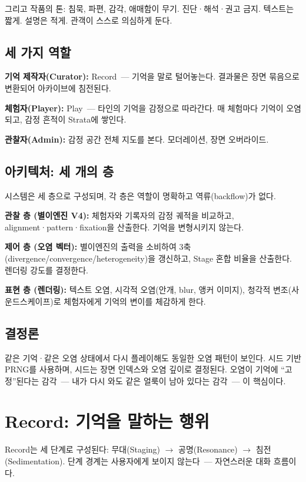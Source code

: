 \documentclass[11pt, a4paper]{article}
\begin{document}
그리고 작품의 톤: 침묵, 파편, 감각, 애매함이 무기. 진단·해석·권고 금지. 텍스트는 짧게. 설명은 적게. 관객이 스스로 의심하게 둔다.

\subsection{세 가지 역할}

\textbf{기억 제작자(Curator):} Record~--- 기억을 말로 털어놓는다. 결과물은 장면 묶음으로 변환되어 아카이브에 침전된다.

\textbf{체험자(Player):} Play~--- 타인의 기억을 감정으로 따라간다. 매 체험마다 기억이 오염되고, 감정 흔적이 Strata에 쌓인다.

\textbf{관찰자(Admin):} 감정 공간 전체 지도를 본다. 모더레이션, 장면 오버라이드.

\subsection{아키텍처: 세 개의 층}

시스템은 세 층으로 구성되며, 각 층은 역할이 명확하고 역류(backflow)가 없다.

\textbf{관찰 층 (별이엔진 V4):} 체험자와 기록자의 감정 궤적을 비교하고, alignment·pattern·fixation을 산출한다. 기억을 변형시키지 않는다.

\textbf{제어 층 (오염 벡터):} 별이엔진의 출력을 소비하여 3축(divergence/convergence/heterogeneity)을 갱신하고, Stage 혼합 비율을 산출한다. 렌더링 강도를 결정한다.

\textbf{표현 층 (렌더링):} 텍스트 오염, 시각적 오염(안개, blur, 앵커 이미지), 청각적 변조(사운드스케이프)로 체험자에게 기억의 변이를 체감하게 한다.

\subsection{결정론}

같은 기억·같은 오염 상태에서 다시 플레이해도 동일한 오염 패턴이 보인다. 시드 기반 PRNG를 사용하며, 시드는 장면 인덱스와 오염 깊이로 결정된다. 오염이 기억에 ``고정''된다는 감각~--- 내가 다시 와도 같은 얼룩이 남아 있다는 감각~--- 이 핵심이다.


\section{Record: 기억을 말하는 행위}

Record는 세 단계로 구성된다: 무대(Staging) $\to$ 공명(Resonance) $\to$ 침전(Sedimentation). 단계 경계는 사용자에게 보이지 않는다~--- 자연스러운 대화 흐름이다.
\end{document}
